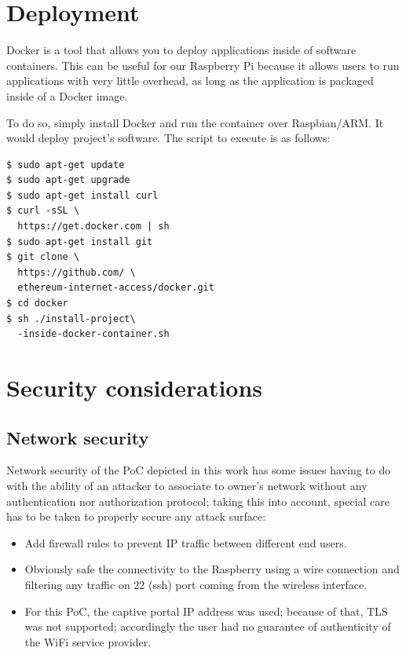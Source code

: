 \documentclass[12pt]{amsart}
\begin{document}
\begin{multicols}{2}
\section{Deployment}\label{sec:deploy}

\vspace{0.35cm}

Docker is a tool that allows you to deploy applications
inside of software containers. This can be useful for our
Raspberry Pi because it allows users to run applications with
very little overhead, as long as the application
is packaged inside of a Docker image.

\vspace{0.35cm}

To do so, simply install Docker and run the container over Raspbian/ARM.
It would deploy project's software. The script to execute is as follows:

\begin{verbatim}
$ sudo apt-get update
$ sudo apt-get upgrade
$ sudo apt-get install curl
$ curl -sSL \
  https://get.docker.com | sh
$ sudo apt-get install git
$ git clone \
  https://github.com/ \
  ethereum-internet-access/docker.git
$ cd docker
$ sh ./install-project\
  -inside-docker-container.sh
\end{verbatim}

\section{Security considerations}

\subsection{Network security}

\vspace{0.35cm}

Network security of the PoC depicted in this work
has some issues having to do with the ability of
an attacker to associate to owner's network without
any authentication nor authorization protocol; taking
this into account, special care has to be taken to
properly secure any attack surface:

\begin{itemize}
\item Add firewall rules to prevent IP traffic between
  different end users.
\item Obviously safe the connectivity to the Raspberry
  using a wire connection and filtering any traffic on 22 (ssh)
  port coming from the wireless interface.
\item For this PoC, the captive portal IP address was used; because of that,
  TLS was not supported; accordingly the user had no guarantee of
  authenticity of the WiFi service provider.
\end{itemize}


\end{multicols}
\end{document}
